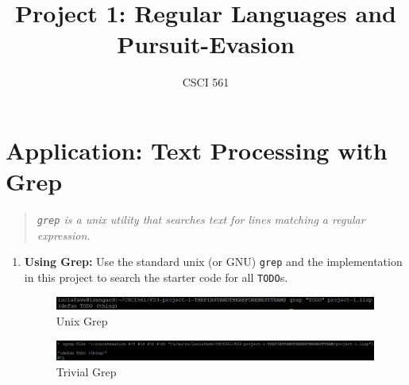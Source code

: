 \documentclass[12pt,letterpaper]{ntdhw}
\title{Project 1: Regular Languages and Pursuit-Evasion}
\author{CSCI 561}
\begin{document}
\pagestyle{fancyplain}

\maketitle
\thispagestyle{fancyplain}



\section*{Application: Text Processing with Grep}

\begin{quote}
  \emph{\texttt{grep} is a unix utility that searches text for lines
    matching a regular expression.}
\end{quote}

\begin{enumerate}
  \item \textbf{Using Grep:} Use the standard unix (or GNU)
  \texttt{grep} and the implementation in this project to search the
  starter code for all \texttt{TODO}s.
  \begin{figure}[htp]
    \centering
    \includegraphics[width=17cm]{unixGrep.JPG}
    \caption{Unix Grep}
  \end{figure}
  \begin{figure}[htp]
    \centering
    \includegraphics[width=17cm]{trivialgrep.jpg}
    \caption{Trivial Grep}
  \end{figure}
  


\end{enumerate}
\end{document}

